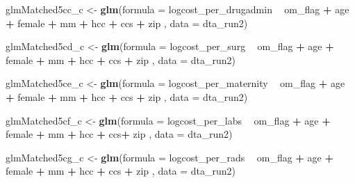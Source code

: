 \documentclass[]{article}
\newenvironment{Shaded}{\begin{snugshade}}{\end{snugshade}}
\newcommand{\KeywordTok}[1]{\textcolor[rgb]{0.13,0.29,0.53}{\textbf{#1}}}
\newcommand{\DataTypeTok}[1]{\textcolor[rgb]{0.13,0.29,0.53}{#1}}
\newcommand{\StringTok}[1]{\textcolor[rgb]{0.31,0.60,0.02}{#1}}
\newcommand{\OperatorTok}[1]{\textcolor[rgb]{0.81,0.36,0.00}{\textbf{#1}}}
\newcommand{\NormalTok}[1]{#1}
\begin{document}
\begin{Shaded}
\begin{Highlighting}[]
\NormalTok{glmMatched5cc_c <-}\StringTok{ }\KeywordTok{glm}\NormalTok{(}\DataTypeTok{formula =}\NormalTok{ logcost_per_drugadmin }\OperatorTok{~}\StringTok{ }\NormalTok{om_flag }\OperatorTok{+}\StringTok{ }\NormalTok{age }\OperatorTok{+}\StringTok{ }\NormalTok{female }\OperatorTok{+}\StringTok{ }\NormalTok{mm }\OperatorTok{+}\StringTok{ }\NormalTok{hcc }\OperatorTok{+}\StringTok{ }\NormalTok{ccs }\OperatorTok{+}\StringTok{ }\NormalTok{zip ,}
                     \DataTypeTok{data    =}\NormalTok{ dta_run2)}

\NormalTok{glmMatched5cd_c <-}\StringTok{ }\KeywordTok{glm}\NormalTok{(}\DataTypeTok{formula =}\NormalTok{ logcost_per_surg }\OperatorTok{~}\StringTok{ }\NormalTok{om_flag }\OperatorTok{+}\StringTok{ }\NormalTok{age }\OperatorTok{+}\StringTok{ }\NormalTok{female }\OperatorTok{+}\StringTok{ }\NormalTok{mm }\OperatorTok{+}\StringTok{ }\NormalTok{hcc }\OperatorTok{+}\StringTok{ }\NormalTok{ccs }\OperatorTok{+}\StringTok{ }\NormalTok{zip ,}
                     \DataTypeTok{data    =}\NormalTok{ dta_run2)}

\NormalTok{glmMatched5ce_c <-}\StringTok{ }\KeywordTok{glm}\NormalTok{(}\DataTypeTok{formula =}\NormalTok{ logcost_per_maternity }\OperatorTok{~}\StringTok{ }\NormalTok{om_flag }\OperatorTok{+}\StringTok{ }\NormalTok{age }\OperatorTok{+}\StringTok{ }\NormalTok{female }\OperatorTok{+}\StringTok{ }\NormalTok{mm }\OperatorTok{+}\StringTok{ }\NormalTok{hcc }\OperatorTok{+}\StringTok{ }\NormalTok{ccs }\OperatorTok{+}\StringTok{ }\NormalTok{zip ,}
                     \DataTypeTok{data    =}\NormalTok{ dta_run2)}

\NormalTok{glmMatched5cf_c <-}\StringTok{ }\KeywordTok{glm}\NormalTok{(}\DataTypeTok{formula =}\NormalTok{ logcost_per_labs }\OperatorTok{~}\StringTok{ }\NormalTok{om_flag }\OperatorTok{+}\StringTok{ }\NormalTok{age }\OperatorTok{+}\StringTok{ }\NormalTok{female }\OperatorTok{+}\StringTok{ }\NormalTok{mm }\OperatorTok{+}\StringTok{ }\NormalTok{hcc }\OperatorTok{+}\StringTok{ }\NormalTok{ccs}\OperatorTok{+}\StringTok{ }\NormalTok{zip  ,}
                     \DataTypeTok{data    =}\NormalTok{ dta_run2)}

\NormalTok{glmMatched5cg_c <-}\StringTok{ }\KeywordTok{glm}\NormalTok{(}\DataTypeTok{formula =}\NormalTok{ logcost_per_rads }\OperatorTok{~}\StringTok{ }\NormalTok{om_flag }\OperatorTok{+}\StringTok{ }\NormalTok{age }\OperatorTok{+}\StringTok{ }\NormalTok{female }\OperatorTok{+}\StringTok{ }\NormalTok{mm }\OperatorTok{+}\StringTok{ }\NormalTok{hcc }\OperatorTok{+}\StringTok{ }\NormalTok{ccs }\OperatorTok{+}\StringTok{ }\NormalTok{zip ,}
                     \DataTypeTok{data    =}\NormalTok{ dta_run2)}
\end{Highlighting}
\end{Shaded}
\end{document}
